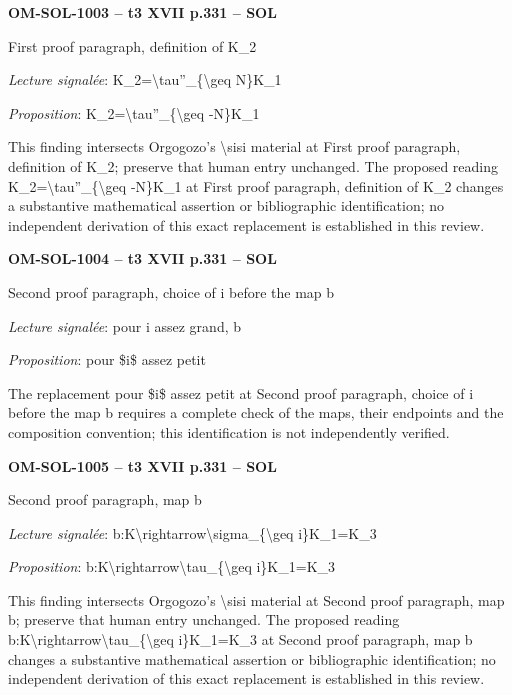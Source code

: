 \par\noindent\textbf{OM-SOL-1003 -- t3 XVII p.331 -- SOL}\par
First proof paragraph, definition of K\_2\par
\emph{Lecture signalée}: K\_2=\allowbreak \textbackslash{}tau''\_\{\textbackslash{}geq N\}K\_1\par
\emph{Proposition}: K\_2=\allowbreak \textbackslash{}tau''\_\{\textbackslash{}geq -N\}K\_1\par
This finding intersects Orgogozo's \textbackslash{}sisi material at First proof paragraph, definition of K\_2; preserve that human entry unchanged. The proposed reading K\_2=\allowbreak \textbackslash{}tau''\_\{\textbackslash{}geq -N\}K\_1 at First proof paragraph, definition of K\_2 changes a substantive mathematical assertion or bibliographic identification; no independent derivation of this exact replacement is established in this review.\par
\par\noindent\textbf{OM-SOL-1004 -- t3 XVII p.331 -- SOL}\par
Second proof paragraph, choice of i before the map b\par
\emph{Lecture signalée}: pour i assez grand, b\par
\emph{Proposition}: pour \$i\$ assez petit\par
The replacement pour \$i\$ assez petit at Second proof paragraph, choice of i before the map b requires a complete check of the maps, their endpoints and the composition convention; this identification is not independently verified.\par
\par\noindent\textbf{OM-SOL-1005 -- t3 XVII p.331 -- SOL}\par
Second proof paragraph, map b\par
\emph{Lecture signalée}: b:K\textbackslash{}rightarrow\textbackslash{}sigma\_\{\textbackslash{}geq i\}K\_1=\allowbreak K\_3\par
\emph{Proposition}: b:K\textbackslash{}rightarrow\textbackslash{}tau\_\{\textbackslash{}geq i\}K\_1=\allowbreak K\_3\par
This finding intersects Orgogozo's \textbackslash{}sisi material at Second proof paragraph, map b; preserve that human entry unchanged. The proposed reading b:K\textbackslash{}rightarrow\textbackslash{}tau\_\{\textbackslash{}geq i\}K\_1=\allowbreak K\_3 at Second proof paragraph, map b changes a substantive mathematical assertion or bibliographic identification; no independent derivation of this exact replacement is established in this review.\par
